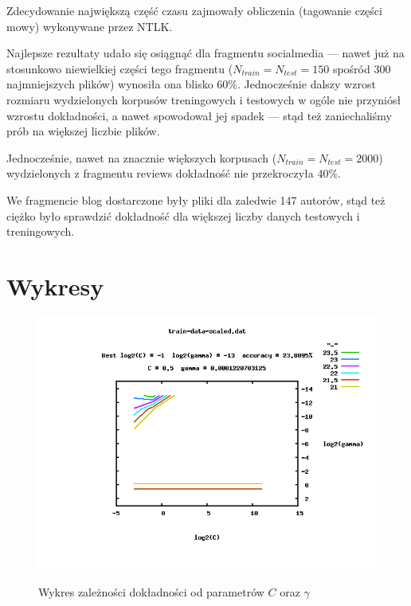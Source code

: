 \documentclass{article}
\begin{document}
Zdecydowanie największą część czasu zajmowały obliczenia (tagowanie części mowy) wykonywane przez NTLK.

Najlepsze rezultaty udało się osiągnąć dla fragmentu socialmedia --- nawet już na stosunkowo niewielkiej części tego fragmentu ($N_{train} = N_{test} =150$ spośród 300 najmniejszych plików) wynosiła ona blisko 60\%. Jednocześnie dalszy wzrost rozmiaru wydzielonych korpusów treningowych i testowych w ogóle nie przyniósł wzrostu dokładności, a nawet spowodował jej spadek --- stąd też zaniechaliśmy prób na większej liczbie plików.

Jednocześnie, nawet na znacznie większych korpusach ($N_{train} = N_{test} = 2000$) wydzielonych z fragmentu reviews dokładność nie przekroczyła 40\%. 

We fragmencie blog dostarczone były pliki dla zaledwie 147 autorów, stąd też ciężko było sprawdzić dokładność dla większej liczby danych testowych i treningowych.


\section{Wykresy}

\begin{figure}[h]
\centering
\includegraphics[scale=1.0]{logc_loggamma_acc}\label{fig:chart}
\caption{Wykres zależności dokładności od parametrów $C$ oraz $\gamma$}
\end{figure}
\end{document}
